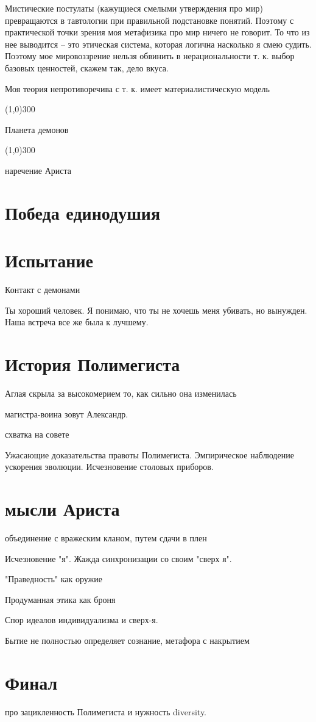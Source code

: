 \documentclass[12pt,a4paper]{article}
\newcommand{\sep}{
	\begin{center}
		\line(1,0){300}
	\end{center}
}
\begin{document}
Мистические постулаты (кажущиеся смелыми утверждения про мир) превращаются в тавтологии при правильной подстановке понятий. Поэтому с практической точки зрения моя метафизика про мир ничего не говорит. То что из нее выводится -- это этическая система, которая логична насколько я смею судить. Поэтому мое мировоззрение нельзя обвинить в нерациональности т. к. выбор базовых ценностей, скажем так, дело вкуса.

Моя теория непротиворечива с т. к. имеет материалистическую модель
\sep

Планета демонов

\sep

наречение Ариста

\section*{Победа единодушия}

\section*{Испытание}

Контакт с демонами

Ты хороший человек. Я понимаю, что ты не хочешь меня убивать, но вынужден. Наша встреча все же была к лучшему.

\section*{История Полимегиста}

Аглая скрыла за высокомерием то, как сильно она изменилась

магистра-воина зовут Александр.

схватка на совете

Ужасающие доказательства правоты Полимегиста. Эмпирическое наблюдение ускорения эволюции. Исчезновение столовых приборов. 

\section*{мысли Ариста}

объединение с вражеским кланом, путем сдачи в плен

Исчезновение "я". Жажда синхронизации со своим "сверх я".

"Праведность" как оружие

Продуманная этика как броня

Спор идеалов индивидуализма и сверх-я. 

Бытие не полностью определяет сознание, метафора с накрытием

\section*{Финал}

про зацикленность Полимегиста и нужность diversity.
\end{document}

